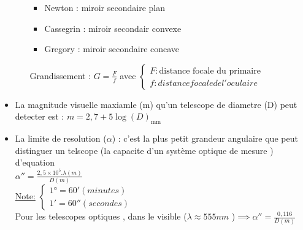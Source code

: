 \documentclass[12pt]{book}
\begin{document}
\begin{itemize}
\begin{itemize}
                    \begin{itemize}
                        \item Newton : miroir secondaire plan 
                        \item Cassegrin : miroir secondair convexe
                        \item Gregory : miroir secondaire concave 
                    \end{itemize}
                    Grandissement : $ G = \frac{F}{f} $ avec $ \begin{cases}
                        F : \text{distance focale du primaire} \\ f : distance focale de l'oculaire
                    \end{cases} $
            \end{itemize}
            \item La magnitude visuelle maxiamle (m) qu'un telescope de diametre (D) peut detecter est : $ m = 2,7 + 5\log(D)_\text{mm} $ \\
            \item La limite de resolution ($\alpha$) : c'est la plus petit grandeur angulaire que peut distinguer un telscope (la capacite d'un système optique de mesure ) d'equation \\
                $ \alpha'' = \frac{2,5\times 10^5 .\lambda(m)}{D(m)}  $ \\
                \underline{Note:} $ \begin{cases}
                    \ang{1} = 60'(minutes)\\
                    1' = 60 '' (secondes)
                \end{cases} $\\
                Pour les telescopes optiques , dans le visible ($ \lambda \approx 555 nm $ )$ \implies \alpha'' =\frac{0,116}{D(m)} $
       \end{itemize}
\end{document}
